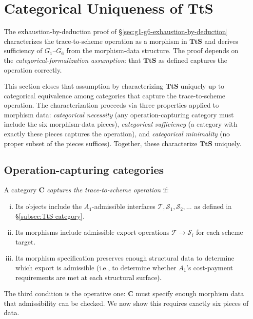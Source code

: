 \section{Categorical Uniqueness of TtS}
\label{sec:g1-g6-categorical-uniqueness}

The exhaustion-by-deduction proof of \S\ref{sec:g1-g6-exhaustion-by-deduction} characterizes the trace-to-scheme operation as a morphism in $\mathbf{TtS}$ and derives sufficiency of $G_1$--$G_6$ from the morphism-data structure. The proof depends on the \emph{categorical-formalization assumption}: that $\mathbf{TtS}$ as defined captures the operation correctly.

This section closes that assumption by characterizing $\mathbf{TtS}$ uniquely up to categorical equivalence among categories that capture the trace-to-scheme operation. The characterization proceeds via three properties applied to morphism data: \emph{categorical necessity} (any operation-capturing category must include the six morphism-data pieces), \emph{categorical sufficiency} (a category with exactly these pieces captures the operation), and \emph{categorical minimality} (no proper subset of the pieces suffices). Together, these characterize $\mathbf{TtS}$ uniquely.

\subsection{Operation-capturing categories}
\label{subsec:operation-capturing}

\begin{definition}
\label{def:operation-capturing}
A category $\mathbf{C}$ \emph{captures the trace-to-scheme operation} if:
\begin{enumerate}[(i)]
\item Its objects include the $A_1$-admissible interfaces $\mathcal{T}, \mathcal{S}_1, \mathcal{S}_2, \dots$ as defined in \S\ref{subsec:TtS-category}.
\item Its morphisms include admissible export operations $\mathcal{T} \to \mathcal{S}_i$ for each scheme target.
\item Its morphism specification preserves enough structural data to determine which export is admissible (i.e., to determine whether $A_1$'s cost-payment requirements are met at each structural surface).
\end{enumerate}
\end{definition}

The third condition is the operative one: $\mathbf{C}$ must specify enough morphism data that admissibility can be checked. We now show this requires exactly six pieces of data.

